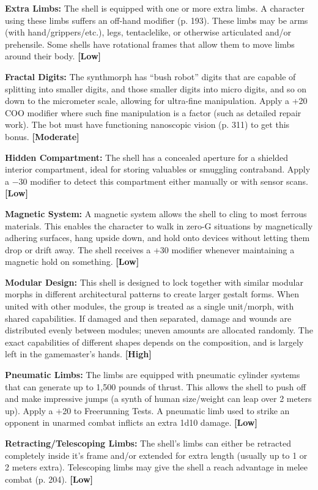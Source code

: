 \textbf{Extra Limbs:} The shell is equipped with one or more extra limbs. A character using these limbs suffers an off-hand modifier (p. 193). These limbs may be arms (with hand/grippers/etc.), legs, tentaclelike, or otherwise articulated and/or prehensile. Some shells have rotational frames that allow them to move limbs around their body. \textbf{[Low]}

\textbf{Fractal Digits:} The synthmorph has ``bush robot'' digits that are capable of splitting into smaller digits, and those smaller digits into micro digits, and so on down to the micrometer scale, allowing for ultra-fine manipulation. Apply a +20 COO modifier where such fine manipulation is a factor (such as detailed repair work). The bot must have functioning nanoscopic vision (p. 311) to get this bonus. \textbf{[Moderate]}

\textbf{Hidden Compartment:} The shell has a concealed aperture for a shielded interior compartment, ideal for storing valuables or smuggling contraband. Apply a $-$30 modifier to detect this compartment either manually or with sensor scans. \textbf{[Low]}

\textbf{Magnetic System:} A magnetic system allows the shell to cling to most ferrous materials. This enables the character to walk in zero-G situations by magnetically adhering surfaces, hang upside down, and hold onto devices without letting them drop or drift away. The shell receives a +30 modifier whenever maintaining a magnetic hold on something. \textbf{[Low]}

\textbf{Modular Design:} This shell is designed to lock together with similar modular morphs in different architectural patterns to create larger gestalt forms. When united with other modules, the group is treated as a single unit/morph, with shared capabilities. If damaged and then separated, damage and wounds are distributed evenly between modules; uneven amounts are allocated randomly. The exact capabilities of different shapes depends on the composition, and is largely left in the gamemaster’s hands. \textbf{[High]}

\textbf{Pneumatic Limbs:} The limbs are equipped with pneumatic cylinder systems that can generate up to 1,500 pounds of thrust. This allows the shell to push off and make impressive jumps (a synth of human size/weight can leap over 2 meters up). Apply a +20 to Freerunning Tests. A pneumatic limb used to strike an opponent in unarmed combat inflicts an extra 1d10 damage. \textbf{[Low]}

\textbf{Retracting/Telescoping Limbs:} The shell’s limbs can either be retracted completely inside it’s frame and/or extended for extra length (usually up to 1 or 2 meters extra). Telescoping limbs may give the shell a reach advantage in melee combat (p. 204). \textbf{[Low]}

